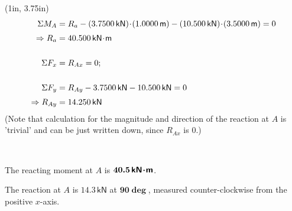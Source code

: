 \documentclass[10pt,oneside]{article}
\begin{document}
\begin{textblock*}{6in}(1in, 3.75in)
  \begin{align*}
    \Sigma M_A &= R_a-(3.7500\,\textsf{kN})\!\cdot\! (1.0000\,\textsf{m})-(10.500\,\textsf{kN})\!\cdot\! (3.5000\,\textsf{m}) = 0 \\[0.25em]
    \Rightarrow R_a &= 40.500\,\mathsf{kN\!\cdot\! m}\\\\
    \Sigma F_x &= R_{Ax} = 0; \\\\
    \Sigma F_y &= R_{Ay} - 3.7500\,\textsf{kN} - 10.500\,\textsf{kN} = 0 \\[0.25em]
    \Rightarrow R_{Ay} &= 14.250\,\textsf{kN}
    \end{align*}
  (Note that calculation for the magnitude and direction of the reaction at $A$ is 'trivial' and can be just written down, since $R_{Ax}$ is $0$.)
  
  \large\centering\parb ~ \parb

  The reacting moment at $A$ is \underline{$\bm{40.5\,\mathbf{\mathsf{kN\!\cdot\! m}}}$}.\parb

  The reaction at $A$ is \underline{$\bm{14.3\,\mathbf{\mathsf{kN}}}$} at \underline{$\bm{90\deg}$}, measured counter-clockwise from the positive $x$-axis.
\end{textblock*}

\end{document}
